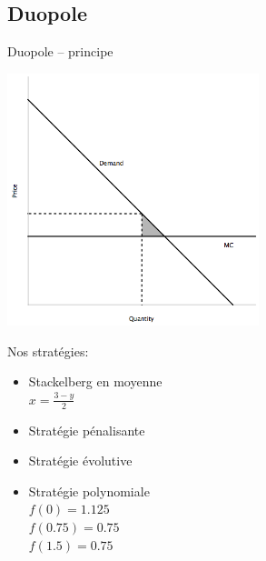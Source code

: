 \documentclass{beamer}
\begin{document}
\subsection{Duopole}
\begin{frame}{Duopole -- principe}
  \begin{vwcol}[widths={0.6,0.4}, sep=.0cm, rule=0pt]
    \includegraphics[width=0.55\textwidth]{jeux/duopole_principe}

    Nos stratégies:
    \begin{itemize}
      \item Stackelberg en moyenne \\
      $x=\frac{3-y}{2}$
      \item Stratégie pénalisante
      \item Stratégie évolutive
      \item Stratégie polynomiale \\
      $f(0) = 1.125$ \\
      $f(0.75) = 0.75$ \\
      $f(1.5) = 0.75$ \\
    \end{itemize}
  \end{vwcol}
\end{frame}
\end{document}
